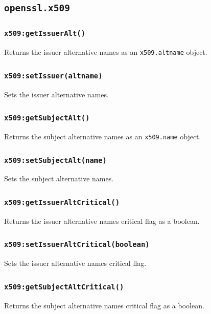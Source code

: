 \documentclass[11pt, oneside]{memoir}
\newcommand*{\fn}[1]{\texttt{#1}\xspace}
\newcommand*{\module}[1]{\texttt{#1}\xspace}
\newcounter{toccols}
\newenvironment{Module}[1]{
	\subsection{\texttt{#1}}
	\addtocontents{toc}{
		\protect\begin{multicols}{\value{toccols}}
	}
}{
	\addtocontents{toc}{\protect\end{multicols}}
}
\begin{document}
\begin{Module}{openssl.x509}
\subsubsection[\fn{x509:getIssuerAlt}]{\fn{x509:getIssuerAlt()}}

Returns the issuer alternative names as an \module{x509.altname} object.

\subsubsection[\fn{x509:setIssuerAlt}]{\fn{x509:setIssuer(altname)}}

Sets the issuer alternative names.

\subsubsection[\fn{x509:getSubjectAlt}]{\fn{x509:getSubjectAlt()}}

Returns the subject alternative names as an \module{x509.name} object.

\subsubsection[\fn{x509:setSubjectAlt}]{\fn{x509:setSubjectAlt(name)}}

Sets the subject alternative names.

\subsubsection[\fn{x509:getIssuerAltCritical}]{\fn{x509:getIssuerAltCritical()}}

Returns the issuer alternative names critical flag as a boolean.

\subsubsection[\fn{x509:setIssuerAltCritical}]{\fn{x509:setIssuerAltCritical(boolean)}}

Sets the issuer alternative names critical flag.

\subsubsection[\fn{x509:getSubjectAltCritical}]{\fn{x509:getSubjectAltCritical()}}

Returns the subject alternative names critical flag as a boolean.


\end{Module}
\end{document}
